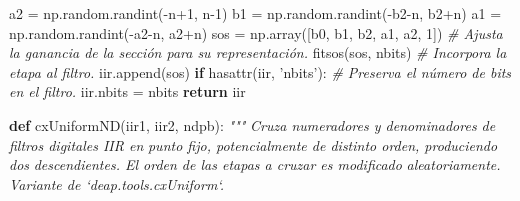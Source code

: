 \documentclass[11pt]{article}
\newenvironment{Shaded}{}{}
\newcommand{\KeywordTok}[1]{\textcolor[rgb]{0.00,0.44,0.13}{\textbf{{#1}}}}
\newcommand{\DecValTok}[1]{\textcolor[rgb]{0.25,0.63,0.44}{{#1}}}
\newcommand{\StringTok}[1]{\textcolor[rgb]{0.25,0.44,0.63}{{#1}}}
\newcommand{\CommentTok}[1]{\textcolor[rgb]{0.38,0.63,0.69}{\textit{{#1}}}}
\newcommand{\NormalTok}[1]{{#1}}
\newcommand{\ControlFlowTok}[1]{\textcolor[rgb]{0.00,0.44,0.13}{\textbf{{#1}}}}
\newcommand{\OperatorTok}[1]{\textcolor[rgb]{0.40,0.40,0.40}{{#1}}}
\newcommand{\BuiltInTok}[1]{{#1}}
\begin{document}
\begin{Shaded}
\begin{Highlighting}[]
{\NormalTok{        a2 }\OperatorTok{=}\NormalTok{ np.random.randint(}\OperatorTok{-}\NormalTok{n}\OperatorTok{+}\DecValTok{1}\NormalTok{, n}\DecValTok{-1}\NormalTok{)}
\NormalTok{        b1 }\OperatorTok{=}\NormalTok{ np.random.randint(}\OperatorTok{-}\NormalTok{b2}\OperatorTok{-}\NormalTok{n, b2}\OperatorTok{+}\NormalTok{n)}
\NormalTok{        a1 }\OperatorTok{=}\NormalTok{ np.random.randint(}\OperatorTok{-}\NormalTok{a2}\OperatorTok{-}\NormalTok{n, a2}\OperatorTok{+}\NormalTok{n)}
\NormalTok{        sos }\OperatorTok{=}\NormalTok{ np.array([b0, b1, b2, a1, a2, }\DecValTok{1}\NormalTok{])}
        \CommentTok{# Ajusta la ganancia de la sección para su representación.}
\NormalTok{        fitsos(sos, nbits)}
        \CommentTok{# Incorpora la etapa al filtro.}
\NormalTok{        iir.append(sos)}
    \ControlFlowTok{if} \BuiltInTok{hasattr}\NormalTok{(iir, }\StringTok{'nbits'}\NormalTok{):}
        \CommentTok{# Preserva el número de bits en el filtro.}
\NormalTok{        iir.nbits }\OperatorTok{=}\NormalTok{ nbits}
    \ControlFlowTok{return}\NormalTok{ iir}


\KeywordTok{def}\NormalTok{ cxUniformND(iir1, iir2, ndpb):}
    \CommentTok{"""}
\CommentTok{    Cruza numeradores y denominadores de filtros digitales IIR en}
\CommentTok{    punto fijo, potencialmente de distinto orden, produciendo dos}
\CommentTok{    descendientes. El orden de las etapas a cruzar es modificado}
\CommentTok{    aleatoriamente. Variante de `deap.tools.cxUniform`.}

}
\end{Highlighting}
\end{Shaded}
\end{document}

